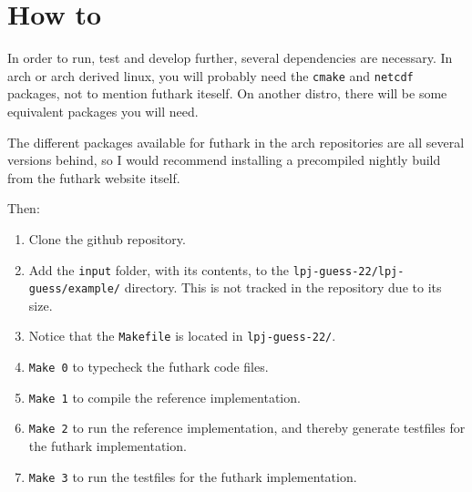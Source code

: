 \section{How to}
In order to run, test and develop further, several dependencies are necessary. In arch or arch derived linux, you will probably need the \texttt{cmake} and \texttt{netcdf} packages, not to mention futhark iteself. On another distro, there will be some equivalent packages you will need.

The different packages available for futhark in the arch repositories are all several versions behind, so I would recommend installing a precompiled nightly build from the futhark website itself.

Then:
\begin{enumerate}
\item Clone the github repository.
\item Add the \texttt{input} folder, with its contents, to the \texttt{lpj-guess-22/lpj-guess/example/} directory. This is not tracked in the repository due to its size.
\item Notice that the \texttt{Makefile} is located in \texttt{lpj-guess-22/}.
\item \texttt{Make 0} to typecheck the futhark code files.
\item \texttt{Make 1} to compile the reference implementation.
\item \texttt{Make 2} to run the reference implementation, and thereby generate testfiles for the futhark implementation.
\item \texttt{Make 3} to run the testfiles for the futhark implementation.
\end{enumerate}
